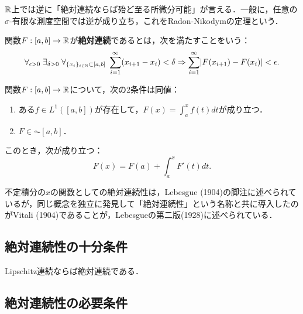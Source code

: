 \documentclass[uplatex, dvipdfmx]{jsreport}
\begin{document}
\begin{tcolorbox}[colframe=ForestGreen, colback=ForestGreen!10!white,breakable,colbacktitle=ForestGreen!40!white,coltitle=black,fonttitle=\bfseries\sffamily,
title=不定積分であるとは絶対連続であるということである]
    $\mathbb{R}$上では逆に「絶対連続ならば殆ど至る所微分可能」が言える．一般に，任意の$\sigma$-有限な測度空間では逆が成り立ち，これをRadon-Nikodymの定理という．
\end{tcolorbox}

\begin{definition}[実数上の関数の絶対連続性]
    関数$F:[a,b]\to\mathbb{R}$が\textbf{絶対連続}であるとは，次を満たすことをいう：
    \[\forall_{\epsilon>0}\;\exists_{\delta>0}\;\forall_{\{x_i\}_{i\in\mathbb{N}}\subset[a,b]}\;\sum^{\infty}_{i=1}(x_{i+1}-x_i)<\delta\Rightarrow\sum^\infty_{i=1}\lvert F(x_{i+1})-F(x_i)\rvert<\epsilon.\]
\end{definition}

\begin{theorem}
    関数$F:[a,b]\to\mathbb{R}$について，次の2条件は同値：
    \begin{enumerate}
        \item ある$f\in L^1([a,b])$が存在して，$F(x)=\int^x_af(t)dt$が成り立つ．
        \item $F\in\AC[a,b]$．
    \end{enumerate}
    このとき，次が成り立つ：
    \[F(x)=F(a)+\int^x_aF'(t)dt.\]
\end{theorem}

\begin{history}
    不定積分の$x$の関数としての絶対連続性は，Lebesgue (1904)の脚注に述べられているが，同じ概念を独立に発見して「絶対連続性」という名称と共に導入したのがVitali (1904)であることが，Lebesgueの第二版(1928)に述べられている．
\end{history}

\subsection{絶対連続性の十分条件}

\begin{proposition}
    Lipschitz連続ならば絶対連続である．
\end{proposition}

\subsection{絶対連続性の必要条件}
\end{document}
